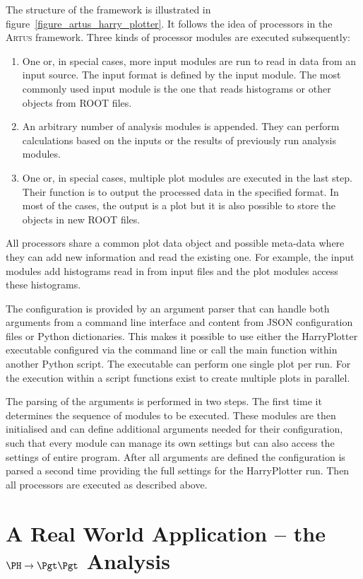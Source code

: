 \documentclass[3p]{elsarticle}
\newcommand{\software}[1]{\textsc{#1}\xspace}
\newcommand{\artus}{\software{Artus}}
\begin{document}
The structure of the framework is illustrated in figure~\ref{figure_artus_harry_plotter}.
It follows the idea of processors in the \artus framework.
Three kinds of processor modules are executed subsequently:
\begin{enumerate}
\item One or, in special cases, more input modules are run to read in data from an input source.
The input format is defined by the input module.
The most commonly used input module is the one that reads histograms or other objects from ROOT files.
\item An arbitrary number of analysis modules is appended.
They can perform calculations based on the inputs or the results of previously run analysis modules.
\item One or, in special cases, multiple plot modules are executed in the last step.
Their function is to output the processed data in the specified format.
In most of the cases, the output is a plot but it is also possible to store the objects in new ROOT files.
\end{enumerate}
All processors share a common plot data object and possible meta-data where they can add new information and read the existing one.
For example, the input modules add histograms read in from input files and the plot modules access these histograms.

The configuration is provided by an argument parser that can handle both arguments from a command line interface and content from JSON configuration files or Python dictionaries.
This makes it possible to use either the HarryPlotter executable configured via the command line or call the main function within another Python script.
The executable can perform one single plot per run.
For the execution within a script functions exist to create multiple plots in parallel.

The parsing of the arguments is performed in two steps.
The first time it determines the sequence of modules to be executed.
These modules are then initialised and can define additional arguments needed for their configuration, such that every module can manage its own settings but can also access the settings of entire program.
After all arguments are defined the configuration is parsed a second time providing the full settings for the HarryPlotter run.
Then all processors are executed as described above.


\section{A Real World Application -- the $\PH\to\Pgt\Pgt$ Analysis \label{section_artus_example_htt}}
\end{document}
